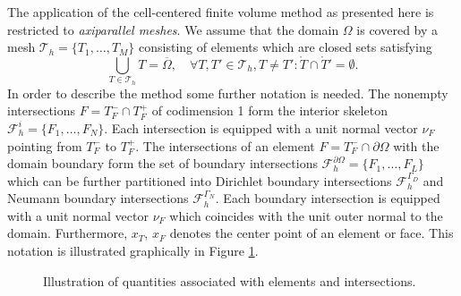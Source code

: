 \documentclass[a4paper,12pt]{article}
\begin{document}
The application of the cell-centered finite volume method as presented here is
restricted to \textit{axiparallel meshes}. We assume that  the domain $\Omega$ is covered by a mesh
$\mathcal{T}_h = \{T_1, \ldots, T_M\}$ consisting of elements
which are closed sets satisfying
\begin{equation}
\bigcup_{T\in \mathcal{T}_h} T = \overline{\Omega}, \quad
\forall T, T' \in \mathcal{T}_h, T\neq T' : \mathring{T} \cap \mathring{T}' = \emptyset .
\end{equation}
In order to describe the method some further notation is needed.
The nonempty intersections $F = T_F^-\cap T_F^+$
of codimension 1 form the interior skeleton $\mathcal{F}_h^i=\{F_1,\ldots,F_N\}$.
Each intersection is equipped with a unit normal vector $\nu_F$ pointing from $T_F^-$ to $T_F^+$.
The intersections of an element $F=T_F^-\cap\partial\Omega$ with the domain
boundary form the set of boundary intersections $\mathcal{F}_h^{\partial\Omega}=
\{F_1,\ldots,F_L\}$ which can be further partitioned into
Dirichlet boundary intersections $\mathcal{F}_h^{\Gamma_D}$
and Neumann boundary intersections $\mathcal{F}_h^{\Gamma_N}$.
Each boundary intersection is equipped with a unit normal vector
$\nu_F$ which coincides with the unit outer normal to the domain.
Furthermore, $x_T$, $x_F$ denotes the center point of an element or face.
This notation is illustrated graphically in Figure \ref{fig:MeshNotation}.

\begin{figure}
\begin{center}
\hspace{0.1\textwidth}
\end{center}
\caption{Illustration of quantities associated with elements and intersections.}
\label{fig:MeshNotation}
\end{figure}
\end{document}
